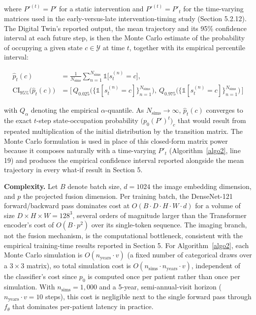 \documentclass[pdflatex,sn-mathphys-num]{sn-jnl}%
\theoremstyle{thmstyleone}%
\theoremstyle{thmstyletwo}%
\theoremstyle{thmstylethree}%
\begin{document}
where $P'^{(t)} = P'$ for a static intervention and $P'^{(t)} = P'_t$ for the time-varying matrices used in the early-versus-late intervention-timing study (Section 5.2.12). The Digital Twin's reported output, the mean trajectory and its 95\% confidence interval at each future step, is then the Monte Carlo estimate of the probability of occupying a given state $c \in \mathcal{Y}$ at time $t$, together with its empirical percentile interval:

\begin{align}
\hat{p}_t(c) &= \frac{1}{N_{\mathrm{sims}}} \sum_{n=1}^{N_{\mathrm{sims}}} \mathbb{1}\big[s_t^{(n)} = c\big], \nonumber \\
\mathrm{CI}_{95\%}\big(\hat{p}_t(c)\big) &= \Big[\, Q_{0.025}\big(\{\mathbb{1}[s_t^{(n)}=c]\}_{n=1}^{N_{\mathrm{sims}}}\big),\ Q_{0.975}\big(\{\mathbb{1}[s_t^{(n)}=c]\}_{n=1}^{N_{\mathrm{sims}}}\big) \,\Big] \label{eq9}
\end{align}

with $Q_\alpha$ denoting the empirical $\alpha$-quantile. As $N_{\mathrm{sims}} \to \infty$, $\hat{p}_t(c)$ converges to the exact $t$-step state-occupation probability $\big(p_0 (P')^t\big)_c$ that would result from repeated multiplication of the initial distribution by the transition matrix. The Monte Carlo formulation is used in place of this closed-form matrix power because it composes naturally with a time-varying $P'_t$ (Algorithm~\ref{algo2}, line 19) and produces the empirical confidence interval reported alongside the mean trajectory in every what-if result in Section 5.

\textbf{Complexity.} Let $B$ denote batch size, $d=1024$ the image embedding dimension, and $p$ the projected fusion dimension. Per training batch, the DenseNet-121 forward/backward pass dominates cost at $O(B \cdot D \cdot H \cdot W \cdot d)$ for a volume of size $D \times H \times W = 128^3$, several orders of magnitude larger than the Transformer encoder's cost of $O(B \cdot p^2)$ over its single-token sequence. The imaging branch, not the fusion mechanism, is the computational bottleneck, consistent with the empirical training-time results reported in Section 5. For Algorithm~\ref{algo2}, each Monte Carlo simulation is $O(n_{\mathrm{years}} \cdot v)$ (a fixed number of categorical draws over a $3\times3$ matrix), so total simulation cost is $O(n_{\mathrm{sims}} \cdot n_{\mathrm{years}} \cdot v)$, independent of the classifier's cost since $p_0$ is computed once per patient rather than once per simulation. With $n_{\mathrm{sims}}=1{,}000$ and a 5-year, semi-annual-visit horizon ($n_{\mathrm{years}} \cdot v = 10$ steps), this cost is negligible next to the single forward pass through $f_\theta$ that dominates per-patient latency in practice.
\end{document}
